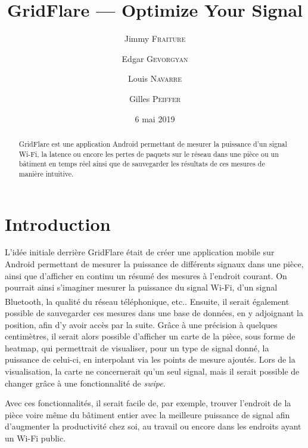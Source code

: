 \documentclass{elsarticle}
\begin{document}
\title{GridFlare --- Optimize Your Signal}
\date{6 mai 2019}

\address[add1]{École Polytechnique, Université catholique de Louvain, Place de l'Université 1, 1348 Ottignies-Louvain-la-Neuve, Belgique}

\author[add1]{Jimmy \textsc{Fraiture}}

\author[add1]{Edgar \textsc{Gevorgyan}}

\author[add1]{Louis \textsc{Navarre}}

\author[add1]{Gilles \textsc{Peiffer}}

\begin{abstract}
GridFlare est une application Android\texttrademark{} permettant de mesurer la puissance d'un signal Wi-Fi, la latence ou encore les pertes de paquets sur le réseau dans une pièce ou un bâtiment en temps réel ainsi que de sauvegarder les résultats de ces mesures de manière intuitive.
\end{abstract}
\maketitle

\section{Introduction}
L'idée initiale derrière GridFlare était de créer une application mobile sur Android\texttrademark{} permettant de mesurer la puissance de différents signaux dans une pièce, ainsi que d'afficher en continu un résumé des mesures à l'endroit courant.
On pourrait ainsi s'imaginer mesurer la puissance du signal Wi-Fi, d'un signal Bluetooth\textsuperscript{\textregistered}, la qualité du réseau téléphonique, etc..
Ensuite, il serait également possible de sauvegarder ces mesures dans une base de données, en y adjoignant la position, afin d'y avoir accès par la suite.
Grâce à une précision à quelques centimètres, il serait alors possible d'afficher un carte de la pièce, sous forme de heatmap, qui permettrait de visualiser, pour un type de signal donné, la puissance de celui-ci, en interpolant via les points de mesure ajoutés.
Lors de la visualisation, la carte ne concernerait qu'un seul signal, mais il serait possible de changer grâce à une fonctionnalité de \emph{swipe}.

Avec ces fonctionnalités, il serait facile de, par exemple, trouver l'endroit de la pièce voire même du bâtiment entier avec la meilleure puissance de signal afin d'augmenter la productivité chez soi, au travail ou encore dans les endroits ayant un Wi-Fi public.
\end{document}
